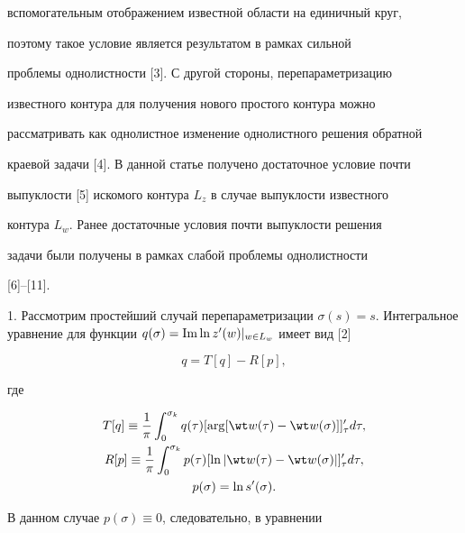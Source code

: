 вспомогательным отображением известной области на единичный круг,


поэтому такое условие является результатом в рамках сильной


проблемы однолистности [3]. С другой стороны, перепараметризацию


известного контура для получения нового простого контура можно


рассматривать как однолистное изменение однолистного решения обратной


краевой задачи [4]. В данной статье получено достаточное условие почти


выпуклости [5] искомого контура $L_z$ в случае выпуклости известного


контура $L_w$. Ранее достаточные условия почти выпуклости решения


задачи были получены в рамках слабой проблемы однолистности


[6]--[11]. 





1. Рассмотрим простейший случай перепараметризации $\sigma (s) =


s$. Интегральное уравнение для функции $q(\sigma) = \im


\ln z'(w)|_{w \in L_w}$ имеет вид [2]


\begin{equation}


q = T[q] - R[p],


\end{equation}


где


\begin{gather}


T[q] \equiv \frac{1}{\pi} \int_0^{\sigma_k} q(\tau) [\arg


[\wt w(\tau) - \wt w(\sigma)]]'_{\tau} d\tau, \\


%


R[p] \equiv \frac{1}{\pi}\int_0^{\sigma_k}


p(\tau) [\ln|\wt w(\tau) - \wt w(\sigma)|]'_{\tau}d\tau,\\


%


p(\sigma) = \ln s'(\sigma). \notag


\end{gather}


В данном случае $p(\sigma) \equiv 0$, следовательно, в уравнении


